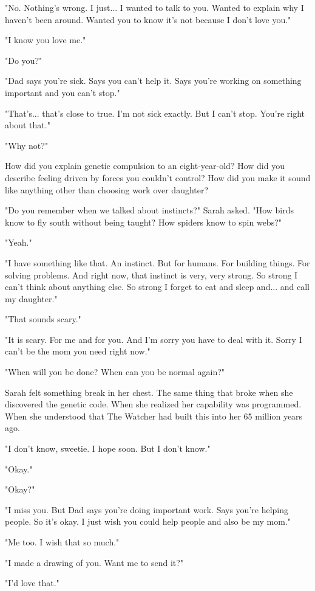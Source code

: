 "No. Nothing's wrong. I just... I wanted to talk to you. Wanted to explain why I haven't been around. Wanted you to know it's not because I don't love you."

"I know you love me."

"Do you?"

"Dad says you're sick. Says you can't help it. Says you're working on something important and you can't stop."

"That's... that's close to true. I'm not sick exactly. But I can't stop. You're right about that."

"Why not?"

How did you explain genetic compulsion to an eight-year-old? How did you describe feeling driven by forces you couldn't control? How did you make it sound like anything other than choosing work over daughter?

"Do you remember when we talked about instincts?" Sarah asked. "How birds know to fly south without being taught? How spiders know to spin webs?"

"Yeah."

"I have something like that. An instinct. But for humans. For building things. For solving problems. And right now, that instinct is very, very strong. So strong I can't think about anything else. So strong I forget to eat and sleep and... and call my daughter."

"That sounds scary."

"It is scary. For me and for you. And I'm sorry you have to deal with it. Sorry I can't be the mom you need right now."

"When will you be done? When can you be normal again?"

Sarah felt something break in her chest. The same thing that broke when she discovered the genetic code. When she realized her capability was programmed. When she understood that The Watcher had built this into her 65 million years ago.

"I don't know, sweetie. I hope soon. But I don't know."

"Okay."

"Okay?"

"I miss you. But Dad says you're doing important work. Says you're helping people. So it's okay. I just wish you could help people and also be my mom."

"Me too. I wish that so much."

"I made a drawing of you. Want me to send it?"

"I'd love that."

